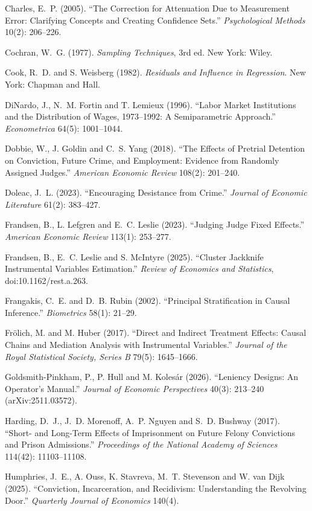 \documentclass[11pt]{article}
\begin{document}
\begin{description}
  \item Charles, E.~P. (2005). ``The Correction for Attenuation Due to Measurement Error: Clarifying Concepts and Creating Confidence Sets.'' \emph{Psychological Methods} 10(2): 206--226.
  \item Cochran, W.~G. (1977). \emph{Sampling Techniques}, 3rd ed. New York: Wiley.
  \item Cook, R.~D. and S. Weisberg (1982). \emph{Residuals and Influence in Regression}. New York: Chapman and Hall.
  \item DiNardo, J., N.~M. Fortin and T. Lemieux (1996). ``Labor Market Institutions and the Distribution of Wages, 1973--1992: A Semiparametric Approach.'' \emph{Econometrica} 64(5): 1001--1044.
  \item Dobbie, W., J. Goldin and C.~S. Yang (2018). ``The Effects of Pretrial Detention on Conviction, Future Crime, and Employment: Evidence from Randomly Assigned Judges.'' \emph{American Economic Review} 108(2): 201--240.
  \item Doleac, J.~L. (2023). ``Encouraging Desistance from Crime.'' \emph{Journal of Economic Literature} 61(2): 383--427.
  \item Frandsen, B., L. Lefgren and E.~C. Leslie (2023). ``Judging Judge Fixed Effects.'' \emph{American Economic Review} 113(1): 253--277.
  \item Frandsen, B., E.~C. Leslie and S. McIntyre (2025). ``Cluster Jackknife Instrumental Variables Estimation.'' \emph{Review of Economics and Statistics}, doi:10.1162/rest.a.263.
  \item Frangakis, C.~E. and D.~B. Rubin (2002). ``Principal Stratification in Causal Inference.'' \emph{Biometrics} 58(1): 21--29.
  \item Frölich, M. and M. Huber (2017). ``Direct and Indirect Treatment Effects: Causal Chains and Mediation Analysis with Instrumental Variables.'' \emph{Journal of the Royal Statistical Society, Series B} 79(5): 1645--1666.
  \item Goldsmith-Pinkham, P., P. Hull and M. Kolesár (2026). ``Leniency Designs: An Operator's Manual.'' \emph{Journal of Economic Perspectives} 40(3): 213--240 (arXiv:2511.03572).
  \item Harding, D.~J., J.~D. Morenoff, A.~P. Nguyen and S.~D. Bushway (2017). ``Short- and Long-Term Effects of Imprisonment on Future Felony Convictions and Prison Admissions.'' \emph{Proceedings of the National Academy of Sciences} 114(42): 11103--11108.
  \item Humphries, J.~E., A. Ouss, K. Stavreva, M.~T. Stevenson and W. van Dijk (2025). ``Conviction, Incarceration, and Recidivism: Understanding the Revolving Door.'' \emph{Quarterly Journal of Economics} 140(4).

\end{description}
\end{document}
